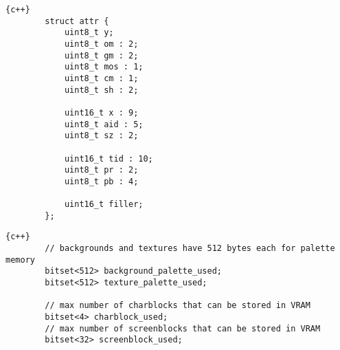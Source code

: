 \begin{itemize}
        \vspace{\onelineskip}
        \begin{lstlisting}[float,caption={\textit{Struct} com \textit{bitfields} para atributos das texturas.}]
        {c++}
        struct attr {
            uint8_t y;
            uint8_t om : 2;
            uint8_t gm : 2;
            uint8_t mos : 1;
            uint8_t cm : 1;
            uint8_t sh : 2;

            uint16_t x : 9;
            uint8_t aid : 5;
            uint8_t sz : 2;

            uint16_t tid : 10;
            uint8_t pr : 2;
            uint8_t pb : 4;

            uint16_t filler;
        };
        \end{lstlisting}
        \vspace{\onelineskip}

        \vspace{\onelineskip}
        \begin{lstlisting}[float,caption={\textit{Bitsets} para checagem de disponibilidade na memória.}]
        {c++}
        // backgrounds and textures have 512 bytes each for palette memory
        bitset<512> background_palette_used;
        bitset<512> texture_palette_used;

        // max number of charblocks that can be stored in VRAM
        bitset<4> charblock_used;
        // max number of screenblocks that can be stored in VRAM
        bitset<32> screenblock_used;
        \end{lstlisting}
        \vspace{\onelineskip}

    \end{itemize}